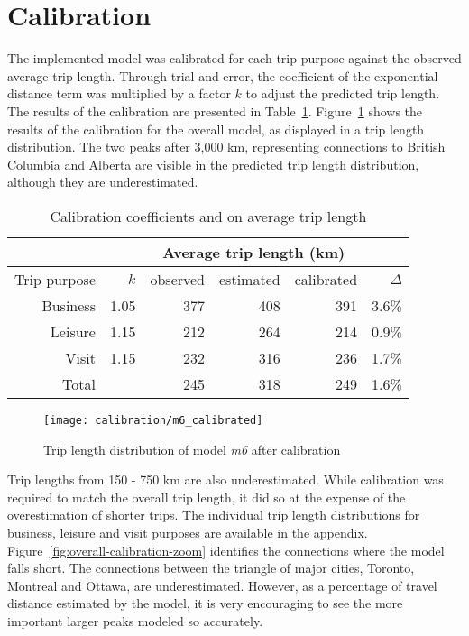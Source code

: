 \section{Calibration}

The implemented model was calibrated for each trip purpose against the observed average trip length. Through trial and error, the coefficient of the exponential distance term was multiplied by a factor $k$ to adjust the predicted trip length. The results of the calibration are presented in Table~\ref{table:calibration}. Figure~\ref{fig:overall-calibration} shows the results of the calibration for the overall model, as displayed in a trip length distribution. The two peaks after 3,000 km, representing connections to British Columbia and Alberta are visible in the predicted trip length distribution, although they are underestimated. 

\begin{table}[H]
\centering
\caption{Calibration coefficients and on average trip length}
\label{table:calibration}
\begin{tabular}{@{}rrrrrr@{}}
  \toprule
 &  & \multicolumn{3}{c}{Average trip length (km)} \\ \midrule
 Trip purpose & $k$ & observed & estimated & calibrated & $\Delta$ \\ \midrule
  Business & 1.05 & 377 & 408 & 391 & 3.6\% \\ 
  Leisure & 1.15 & 212 & 264 & 214  & 0.9\% \\
  Visit  & 1.15  & 232 & 316 & 236  & 1.7\%\\   \midrule
  Total  &  & 245 & 318 & 249 & 1.6\% \\ 
   \bottomrule
\end{tabular}
\end{table}

\begin{figure}[H]
\centering
\texttt{[image: calibration/m6\_calibrated]}
\caption{Trip length distribution of model \textit{m6} after calibration}
\label{fig:overall-calibration}
\end{figure}

Trip lengths from 150 - 750 km are also underestimated. While calibration was required to match the overall trip length, it did so at the expense of the overestimation of shorter trips. The individual trip length distributions for business, leisure and visit purposes are available in the appendix. Figure~\ref{fig:overall-calibration-zoom} identifies the connections where the model falls short. The connections between the triangle of major cities, Toronto, Montreal and Ottawa, are underestimated. However, as a percentage of travel distance estimated by the model, it is very encouraging to see the more important larger peaks modeled so accurately. 

